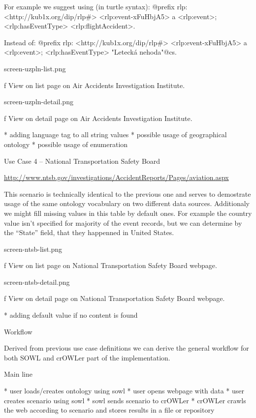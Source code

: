 For example we suggest using (in turtle syntax): 
\begtt
@prefix rlp: <http://kub1x.org/dip/rlp#>
<rlp:event-xFuHbjA5> a <rlp:event>; 
          <rlp:hasEventType> <rlp:flightAccident>. 
\endtt

Instead of: 
\begtt
@prefix rlp: <http://kub1x.org/dip/rlp#>
<rlp:event-xFuHbjA5> a <rlp:event>; 
          <rlp:hasEventType> "Letecká nehoda"@cs. 
\endtt

\midinsert
\picw=12cm \cinspic screen-uzpln-list.png
\caption/f View on list page on Air Accidents Investigation Institute. 
\endinsert

\midinsert
\picw=12cm \cinspic screen-uzpln-detail.png
\caption/f View on detail page on Air Accidents Investigation Institute. 
\endinsert

\begitems
  * adding language tag to all string values
  * possible usage of geographical ontology
  * possible usage of enumeration
\enditems


\secc Use Case 4 -- National Transportation Safety Board

\url{http://www.ntsb.gov/investigations/AccidentReports/Pages/aviation.aspx}

This scenario is technically identical to the previous one and serves to
demostrate usage of the same ontology vocabulary on two different data sources.
Additionaly we might fill missing values in this table by default ones. For
example the country value isn't specified for majority of the event records,
but we can determine by the ``State'' field, that they happenned in United
States. 

\midinsert
\picw=12cm \cinspic screen-ntsb-list.png
\caption/f View on list page on National Transportation Safety Board webpage. 
\endinsert

\midinsert
\picw=12cm \cinspic screen-ntsb-detail.png
\caption/f View on detail page on National Transportation Safety Board webpage. 
\endinsert

\begitems
  * adding default value if no content is found
\enditems


\sec Workflow

Derived from previous use case definitions we can derive the general workflow
for both SOWL and crOWLer part of the implementation. 

\secc Main line

\begitems
  * user loads/creates ontology using sowl
  * user opens webpage with data
  * user creates scenario using sowl
  * sowl sends scenario to crOWLer
  * crOWLer crawls the web according to scenario and stores results in a file
    or repository
\enditems


